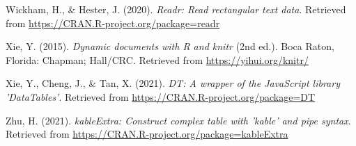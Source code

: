 \documentclass[
  man]{apa7}
\newlength{\cslhangindent}
\newlength{\cslentryspacingunit} %
\newenvironment{CSLReferences}[2] %
 {%
  \setlength{\parindent}{0pt}
  \ifodd #1
  \let\oldpar\par
  \def\par{\hangindent=\cslhangindent\oldpar}
  \fi
  \setlength{\parskip}{#2\cslentryspacingunit}
 }%
 {}
\begin{document}
\begin{CSLReferences}{1}{0}
\leavevmode{}%
Wickham, H., \& Hester, J. (2020). \emph{Readr: Read rectangular text data}. Retrieved from \url{https://CRAN.R-project.org/package=readr}

\leavevmode{}%
Xie, Y. (2015). \emph{Dynamic documents with {R} and knitr} (2nd ed.). Boca Raton, Florida: Chapman; Hall/CRC. Retrieved from \url{https://yihui.org/knitr/}

\leavevmode{}%
Xie, Y., Cheng, J., \& Tan, X. (2021). \emph{DT: A wrapper of the JavaScript library 'DataTables'}. Retrieved from \url{https://CRAN.R-project.org/package=DT}

\leavevmode{}%
Zhu, H. (2021). \emph{kableExtra: Construct complex table with 'kable' and pipe syntax}. Retrieved from \url{https://CRAN.R-project.org/package=kableExtra}

\end{CSLReferences}

\endgroup
\end{document}
